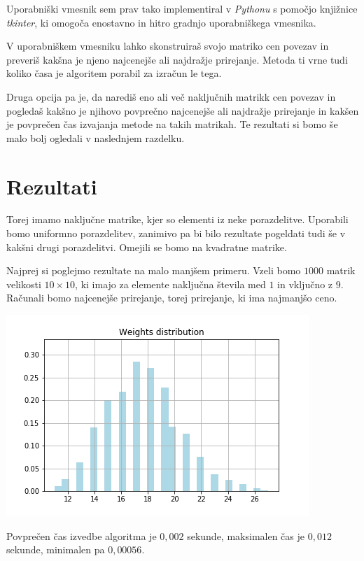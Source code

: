 \documentclass[a4paper, 12pt]{article}
\begin{document}
Uporabniški vmesnik sem prav tako implementiral v \textit{Pythonu} s pomočjo
knjižnice \textit{tkinter}, ki omogoča enostavno in hitro gradnjo uporabniškega
vmesnika.

V uporabniškem vmesniku lahko skonstruiraš svojo matriko cen povezav in preveriš
kakšna je njeno najcenejše ali najdražje prirejanje. Metoda ti vrne tudi koliko
časa je algoritem porabil za izračun le tega.

Druga opcija pa je, da narediš eno ali več naključnih matrikk cen povezav in
pogledaš kakšno je njihovo povprečno najcenejše ali najdražje prirejanje in
kakšen je povprečen čas izvajanja metode na takih matrikah. Te rezultati si
bomo še malo bolj ogledali v naslednjem razdelku.

\section{Rezultati}

Torej imamo naključne matrike, kjer so elementi iz neke porazdelitve. Uporabili
bomo uniformno porazdelitev, zanimivo pa bi bilo rezultate pogeldati tudi še v
kakšni drugi porazdelitvi. Omejili se bomo na kvadratne matrike.

Najprej si poglejmo rezultate na malo manjšem primeru. Vzeli bomo $1000$ matrik
velikosti $10 \times 10$, ki imajo za elemente naključna števila med $1$ in vključno
z $9$. Računali bomo najcenejše prirejanje, torej prirejanje, ki ima najmanjšo ceno.

\includegraphics[width=\textwidth]{../slike/picture1011min.png}

Povprečen čas izvedbe algoritma je $0,002$ sekunde, maksimalen čas je $0,012$ sekunde, minimalen pa $0,00056$.
\end{document}
